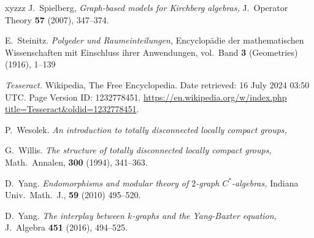 \documentclass[12pt]{amsart}
\theoremstyle{definition}
\theoremstyle{remark}
\numberwithin{equation}{section}
\begin{document}
\begin{thebibliography}{xyzzz}
 J.\ Spielberg, \emph{Graph-based models for Kirchberg algebras,} J.\ Operator Theory \textbf{57} (2007), 347--374.

 E.\ Steinitz. \emph{Polyeder und Raumeinteilungen,} Encyclop{\"a}die der mathematischen 
Wissenschaften mit Einschluss ihrer Anwendungen, vol.\ Band \textbf{3} (Geometries)  (1916), 1--139



 \emph{Tesseract.} Wikipedia, The Free Encyclopedia. Date retrieved: 16 July 2024 03:50 UTC. Page Version ID: 1232778451. \href{https://en.wikipedia.org/w/index.php title=Tesseract\&oldid=1232778451}{https://en.wikipedia.org/w/index.php title=Tesseract\&oldid=1232778451}.

 P.\ Wesolek. \emph{An introduction to totally disconnected locally compact groups,}


 G.\ Willis. \emph{The structure of totally disconnected locally compact groups,} Math.\ Annalen, \textbf{300} (1994), 341--363.

  D.\ Yang. \emph{Endomorphisms and modular theory of $2$-graph $C^*$-algebras,} Indiana Univ.\ Math.\ J., \textbf{59} (2010) 495--520. 

 D.\ Yang. \emph{The interplay between $k$-graphs and the Yang-Baxter equation,} J.\ Algebra \textbf{451} (2016), 494--525. 


\end{thebibliography}
\end{document}
